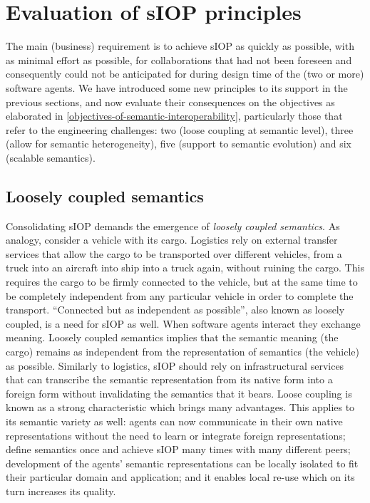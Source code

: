 \documentclass[sort&compress,preprint,authoryear,3p,twocolumn]{elsarticle}
\begin{document}
\hypertarget{evaluation-of-siop-principles}{%
\section{Evaluation of sIOP
principles}\label{evaluation-of-siop-principles}}

The main (business) requirement is to achieve sIOP as quickly as
possible, with as minimal effort as possible, for collaborations that
had not been foreseen and consequently could not be anticipated for
during design time of the (two or more) software agents. We have
introduced some new principles to its support in the previous sections,
and now evaluate their consequences on the objectives as elaborated in
\cref{objectives-of-semantic-interoperability}, particularly those that
refer to the engineering challenges: two (loose coupling at semantic
level), three (allow for semantic heterogeneity), five (support to
semantic evolution) and six (scalable semantics).

\hypertarget{loosely-coupled-semantics}{%
\subsection{Loosely coupled semantics}\label{loosely-coupled-semantics}}

Consolidating sIOP demands the emergence of \emph{loosely coupled
semantics}. As analogy, consider a vehicle with its cargo. Logistics
rely on external transfer services that allow the cargo to be
transported over different vehicles, from a truck into an aircraft into
ship into a truck again, without ruining the cargo. This requires the
cargo to be firmly connected to the vehicle, but at the same time to be
completely independent from any particular vehicle in order to complete
the transport. ``Connected but as independent as possible'', also known
as loosely coupled, is a need for sIOP as well. When software agents
interact they exchange meaning. Loosely coupled semantics implies that
the semantic meaning (the cargo) remains as independent from the
representation of semantics (the vehicle) as possible. Similarly to
logistics, sIOP should rely on infrastructural services that can
transcribe the semantic representation from its native form into a
foreign form without invalidating the semantics that it bears. Loose
coupling is known as a strong characteristic which brings many
advantages. This applies to its semantic variety as well: agents can now
communicate in their own native representations without the need to
learn or integrate foreign representations; define semantics once and
achieve sIOP many times with many different peers; development of the
agents' semantic representations can be locally isolated to fit their
particular domain and application; and it enables local re-use which on
its turn increases its quality.
\end{document}
